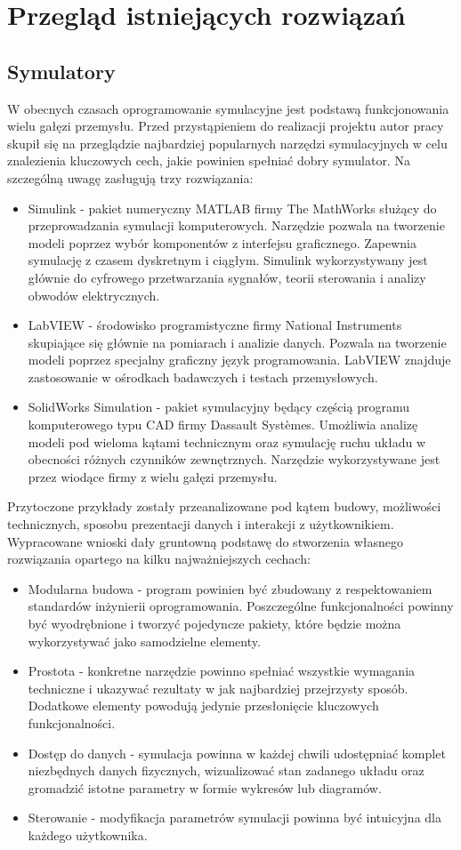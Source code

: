 \documentclass[12pt, oneside]{report}
\theoremstyle{definition}
\begin{document}
\section{Przegląd istniejących rozwiązań}
\subsection{Symulatory}
W obecnych czasach oprogramowanie symulacyjne jest podstawą funkcjonowania wielu gałęzi przemysłu. Przed przystąpieniem do realizacji projektu autor pracy skupił się na przeglądzie najbardziej popularnych narzędzi symulacyjnych w celu znalezienia kluczowych cech, jakie powinien spełniać dobry symulator. Na szczególną uwagę zasługują trzy rozwiązania:
\begin{itemize}
\item Simulink - pakiet numeryczny MATLAB firmy The MathWorks służący do przeprowadzania symulacji komputerowych. Narzędzie pozwala na tworzenie modeli poprzez wybór komponentów z interfejsu graficznego. Zapewnia symulację z czasem dyskretnym i ciągłym. Simulink wykorzystywany jest głównie do cyfrowego przetwarzania sygnałów, teorii sterowania i analizy obwodów elektrycznych.
\item LabVIEW - środowisko programistyczne firmy National Instruments skupiające się głównie na pomiarach i analizie danych. Pozwala na tworzenie modeli poprzez specjalny graficzny język programowania. LabVIEW znajduje zastosowanie w ośrodkach badawczych i testach przemysłowych.
\item SolidWorks Simulation - pakiet symulacyjny będący częścią programu komputerowego typu CAD firmy Dassault Systèmes. Umożliwia analizę modeli pod wieloma kątami technicznym oraz symulację ruchu układu w obecności różnych czynników zewnętrznych. Narzędzie wykorzystywane jest przez wiodące firmy z wielu gałęzi przemysłu.  
\end{itemize}

Przytoczone przykłady zostały przeanalizowane pod kątem budowy, możliwości technicznych, sposobu prezentacji danych i interakcji z użytkownikiem. Wypracowane wnioski dały gruntowną podstawę do stworzenia własnego rozwiązania opartego na kilku najważniejszych cechach:
\begin{itemize}
\item Modularna budowa - program powinien być zbudowany z respektowaniem standardów inżynierii oprogramowania. Poszczególne funkcjonalności powinny być wyodrębnione i tworzyć pojedyncze pakiety, które będzie można wykorzystywać jako samodzielne elementy.
\item Prostota - konkretne narzędzie powinno spełniać wszystkie wymagania techniczne i ukazywać rezultaty w jak najbardziej przejrzysty sposób. Dodatkowe elementy powodują jedynie przesłonięcie kluczowych funkcjonalności.
\item Dostęp do danych - symulacja powinna w każdej chwili udostępniać komplet niezbędnych danych fizycznych, wizualizować stan zadanego układu oraz gromadzić istotne parametry w formie wykresów lub diagramów.
\item Sterowanie - modyfikacja parametrów symulacji powinna być intuicyjna dla każdego użytkownika.
\end{itemize}
\end{document}
